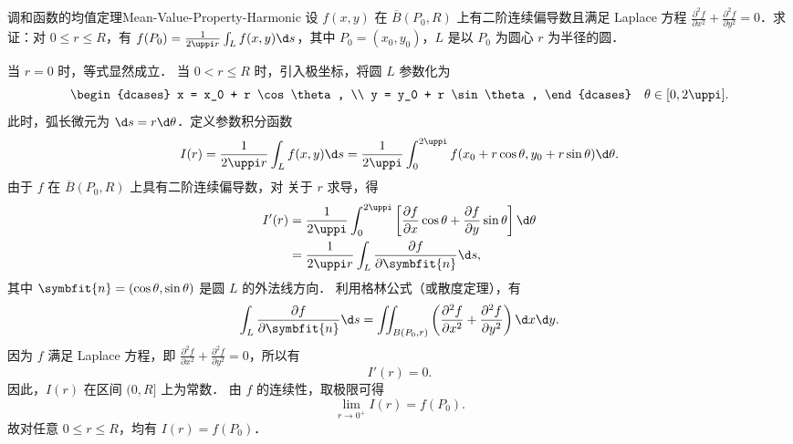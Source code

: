 \begin{problem}{调和函数的均值定理}{Mean-Value-Property-Harmonic}
    设 $f(x,y)$ 在 $\overline{B}(P_0, R)$ 上有二阶连续偏导数且满足 Laplace 方程 $\frac{\partial^2 f}{\partial x^2} + \frac{\partial^2 f}{\partial y^2} = 0$．求证：对 $0 \le r \le R$，有 $f(P_0) = \frac{1}{2\uppi r} \int_L f(x,y) \d s$，其中 $P_0 = (x_0,y_0)$，$L$ 是以 $P_0$ 为圆心 $r$ 为半径的圆．
\end{problem}

\begin{myproof}
    当 $r = 0$ 时，等式显然成立．
    当 $0 < r \le R$ 时，引入极坐标，将圆 $L$ 参数化为
    \begin{equation}
        \label{eq:param-circle}
        \begin{dcases}
            x = x_0 + r \cos \theta, \\
            y = y_0 + r \sin \theta,
        \end{dcases} \quad \theta \in [0, 2\uppi].
    \end{equation}
    此时，弧长微元为 $\d s = r \d \theta$．定义参数积分函数
    \begin{equation}
        \label{eq:def-I}
        I(r) = \frac{1}{2\uppi r} \int_{L} f(x,y) \d s = \frac{1}{2\uppi} \int_{0}^{2\uppi} f(x_0 + r \cos \theta, y_0 + r \sin \theta) \d \theta.
    \end{equation}
    由于 $f$ 在 $\overline{B}(P_0, R)$ 上具有二阶连续偏导数，对  关于 $r$ 求导，得
    \begin{equation}
        \label{eq:deriv-I}
        \begin{aligned}
            I'(r) & = \frac{1}{2\uppi} \int_{0}^{2\uppi} \left[ \frac{\partial f}{\partial x} \cos \theta + \frac{\partial f}{\partial y} \sin \theta \right] \d \theta \\
                  & = \frac{1}{2\uppi r} \int_{L} \frac{\partial f}{\partial \symbfit{n}} \d s,
        \end{aligned}
    \end{equation}
    其中 $\symbfit{n} = (\cos \theta, \sin \theta)$ 是圆 $L$ 的外法线方向．
    利用格林公式（或散度定理），有
    \begin{equation}
        \int_{L} \frac{\partial f}{\partial \symbfit{n}} \d s = \iint_{B(P_0, r)} \left( \frac{\partial^2 f}{\partial x^2} + \frac{\partial^2 f}{\partial y^2} \right) \d x \d y.
    \end{equation}
    因为 $f$ 满足 Laplace 方程，即 $\frac{\partial^2 f}{\partial x^2} + \frac{\partial^2 f}{\partial y^2} = 0$，所以有
    \begin{equation}
        \label{eq:zero-deriv}
        I'(r) = 0.
    \end{equation}
    因此，$I(r)$ 在区间 $(0, R]$ 上为常数．
    由 $f$ 的连续性，取极限可得
    \begin{equation}
        \lim_{r \to 0^+} I(r) = f(P_0).
    \end{equation}
    故对任意 $0 \le r \le R$，均有 $I(r) = f(P_0)$．
\end{myproof}


